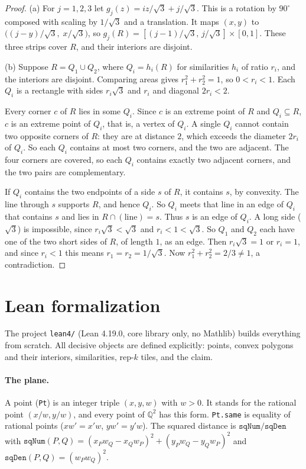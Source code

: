 \documentclass[11pt]{article}
\theoremstyle{definition}
\theoremstyle{remark}
\begin{document}
\begin{proof}
(a) For $j=1,2,3$ let $g_j(z)=iz/\sqrt3+j/\sqrt3$. This is a rotation by $90^\circ$
composed with scaling by $1/\sqrt3$ and a translation. It maps $(x,y)$ to
$\bigl((j-y)/\sqrt3,\;x/\sqrt3\bigr)$, so $g_j(R)=[(j-1)/\sqrt3,\,j/\sqrt3]\times[0,1]$. These three strips
cover $R$, and their interiors are disjoint.

(b) Suppose $R=Q_1\cup Q_2$, where $Q_i=h_i(R)$ for similarities $h_i$ of ratio $r_i$,
and the interiors are disjoint. Comparing areas gives $r_1^2+r_2^2=1$, so $0<r_i<1$. Each
$Q_i$ is a rectangle with sides $r_i\sqrt3$ and $r_i$ and diagonal $2r_i<2$.

Every corner $c$ of $R$ lies in some $Q_i$. Since $c$ is an extreme point of $R$ and
$Q_i\subseteq R$, $c$ is an extreme point of $Q_i$, that is, a vertex of $Q_i$. A single
$Q_i$ cannot contain two opposite corners of $R$: they are at distance $2$, which exceeds
the diameter $2r_i$ of $Q_i$. So each $Q_i$ contains at most two corners, and the two are
adjacent. The four corners are covered, so each $Q_i$ contains exactly two adjacent
corners, and the two pairs are complementary.

If $Q_i$ contains the two endpoints of a side $s$ of $R$, it contains $s$, by convexity.
The line through $s$ supports $R$, and hence $Q_i$. So $Q_i$ meets that line in an edge of
$Q_i$ that contains $s$ and lies in $R\cap(\text{line})=s$. Thus $s$ is an edge of $Q_i$.
A long side ($\sqrt3$) is impossible, since $r_i\sqrt3<\sqrt3$ and $r_i<1<\sqrt3$. So
$Q_1$ and $Q_2$ each have one of the two short sides of $R$, of length $1$, as an edge.
Then $r_i\sqrt3=1$ or $r_i=1$, and since $r_i<1$ this means $r_1=r_2=1/\sqrt3$. Now
$r_1^2+r_2^2=2/3\ne1$, a contradiction.
\end{proof}

\section{Lean formalization}\label{sec:lean}

The project \texttt{lean4/} (Lean 4.19.0, core library only, no Mathlib) builds everything
from scratch. All decisive objects are defined explicitly: points, convex polygons and
their interiors, similarities, rep-$k$ tiles, and the claim.

\paragraph{The plane.} A point (\texttt{Pt}) is an integer triple $(x,y,w)$ with $w>0$. It
stands for the rational point $(x/w,y/w)$, and every point of $\mathbb Q^2$ has this form.
\texttt{Pt.same} is equality of rational points ($xw'=x'w$, $yw'=y'w$). The squared
distance is $\texttt{sqNum}/\texttt{sqDen}$ with
$\texttt{sqNum}(P,Q)=(x_Pw_Q-x_Qw_P)^2+(y_Pw_Q-y_Qw_P)^2$ and
$\texttt{sqDen}(P,Q)=(w_Pw_Q)^2$.
\end{document}
